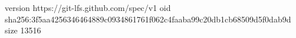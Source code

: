 version https://git-lfs.github.com/spec/v1
oid sha256:3f5aa4256346464889c0934861761f062c4faaba99c20db1cb68509d5f0dab9d
size 13516
